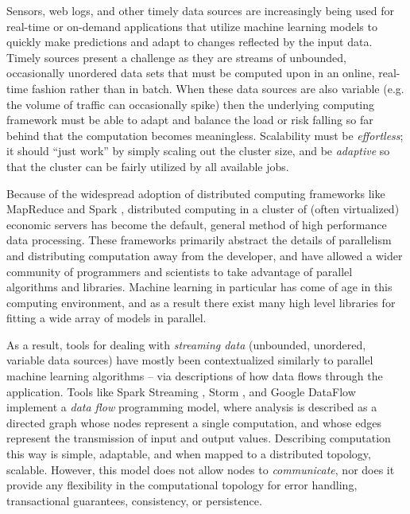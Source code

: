 \documentclass[conference,twocolumn,10pt]{IEEEtran}
\begin{document}
Sensors, web logs, and other timely data sources are increasingly being used for  real-time or on-demand applications that utilize machine learning models to quickly make predictions and adapt to changes reflected by the input data. Timely sources present a challenge as they are streams of unbounded, occasionally unordered data sets that must be computed upon in an online, real-time fashion rather than in batch. When these data sources are also variable (e.g. the volume of traffic can occasionally spike) then the underlying computing framework must be able to adapt and balance the load or risk falling so far behind that the computation becomes meaningless. Scalability must be \textit{effortless}; it should ``just work'' by simply scaling out the cluster size, and be \textit{adaptive} so that the cluster can be fairly utilized by all available jobs.

Because of the widespread adoption of distributed computing frameworks like MapReduce \cite{dean_mapreduce:_2008} and Spark \cite{zaharia_resilient_2012}, distributed computing in a cluster of (often virtualized) economic servers has become the default, general method of high performance data processing. These frameworks primarily abstract the details of parallelism and distributing computation away from the developer, and have allowed a wider community of programmers and scientists to take advantage of parallel algorithms and libraries. Machine learning in particular has come of age in this computing environment, and as a result there exist many high level libraries for fitting a wide array of models in parallel.

As a result, tools for dealing with \textit{streaming data} (unbounded, unordered, variable data sources) have mostly been contextualized similarly to parallel machine learning algorithms -- via descriptions of how data flows through the application. Tools like Spark Streaming \cite{zaharia_discretized_2012}, Storm \cite{toshniwal_storm_2014}, and Google DataFlow \cite{akidau_dataflow_2015} implement a \textit{data flow} programming model, where analysis is described as a directed graph whose nodes represent a single computation, and whose edges represent the transmission of input and output values. Describing computation this way is simple, adaptable, and when mapped to a distributed topology, scalable. However, this model does not allow nodes to \textit{communicate}, nor does it provide any flexibility in the computational topology for error handling, transactional guarantees, consistency, or persistence.
\end{document}
